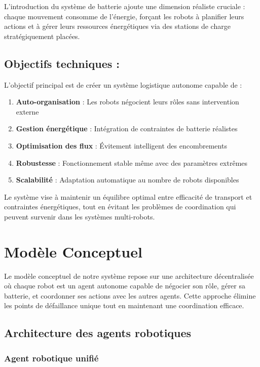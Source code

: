 \documentclass[12pt,a4paper]{article}
\begin{document}
L'introduction du système de batterie ajoute une dimension réaliste cruciale : chaque mouvement consomme de l'énergie, forçant les robots à planifier leurs actions et à gérer leurs ressources énergétiques via des stations de charge stratégiquement placées.

\subsection{Objectifs techniques :}

L'objectif principal est de créer un système logistique autonome capable de :

\begin{enumerate}
    \item \textbf{Auto-organisation} : Les robots négocient leurs rôles sans intervention externe
    \item \textbf{Gestion énergétique} : Intégration de contraintes de batterie réalistes
    \item \textbf{Optimisation des flux} : Évitement intelligent des encombrements
    \item \textbf{Robustesse} : Fonctionnement stable même avec des paramètres extrêmes
    \item \textbf{Scalabilité} : Adaptation automatique au nombre de robots disponibles
\end{enumerate}

Le système vise à maintenir un équilibre optimal entre efficacité de transport et contraintes énergétiques, tout en évitant les problèmes de coordination qui peuvent survenir dans les systèmes multi-robots.

\section{Modèle Conceptuel}

Le modèle conceptuel de notre système repose sur une architecture décentralisée où chaque robot est un agent autonome capable de négocier son rôle, gérer sa batterie, et coordonner ses actions avec les autres agents. Cette approche élimine les points de défaillance unique tout en maintenant une coordination efficace.

\subsection{Architecture des agents robotiques}

\subsubsection{Agent robotique unifié}
\end{document}
